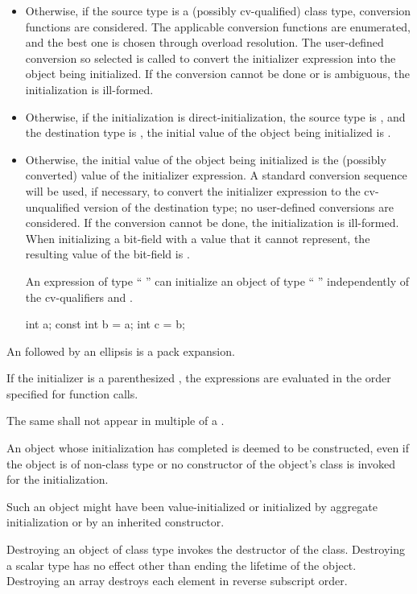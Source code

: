 \begin{itemize}
\item
Otherwise, if the source type
is a (possibly cv-qualified) class type, conversion functions are
considered.
The applicable conversion functions are enumerated,
and the best one is chosen through overload
resolution.
The user-defined conversion so selected
is called to convert the initializer expression into the
object being initialized.
If the conversion cannot be done or is
ambiguous, the initialization is ill-formed.
\item
Otherwise, if the initialization is direct-initialization,
the source type is , and
the destination type is ,
the initial value of the object being initialized is .
\item
Otherwise, the initial value of the object being initialized is
the (possibly converted) value of the initializer expression.
A standard conversion sequence will be used, if necessary,
to convert the initializer expression to the cv-unqualified version of
the destination type;
no user-defined conversions are considered.
If the conversion cannot
be done, the initialization is ill-formed.
When initializing a bit-field with a value that it cannot represent, the
resulting value of the bit-field is
.
%
\begin{note}
An expression of type
`` ''
can initialize an object of type
`` ''
independently of
the cv-qualifiers
and .

\begin{codeblock}
int a;
const int b = a;
int c = b;
\end{codeblock}
\end{note}
\end{itemize}

\pnum
An  followed by an ellipsis is a
pack expansion.

\pnum
If the initializer is a parenthesized ,
the expressions are evaluated in the order
specified for function calls.

\pnum
The same 
shall not appear in multiple  of a
.

\pnum
An object whose initialization has completed
is deemed to be constructed,
even if the object is of non-class type or
no constructor of the object's class
is invoked for the initialization.
\begin{note}
Such an object might have been value-initialized
or initialized by aggregate initialization
or by an inherited constructor.
\end{note}
Destroying an object of class type invokes the destructor of the class.
Destroying a scalar type has no effect other than
ending the lifetime of the object.
Destroying an array destroys each element in reverse subscript order.

